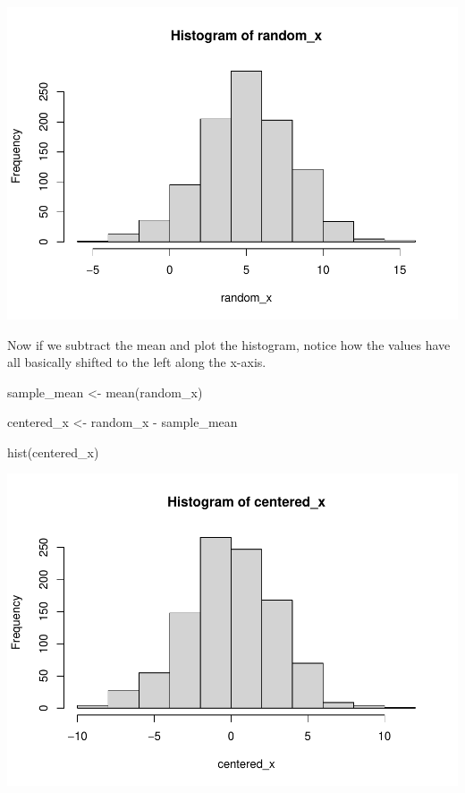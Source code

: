 \documentclass[
]{book}
\newenvironment{Shaded}{\begin{snugshade}}{\end{snugshade}}
\newcommand{\FunctionTok}[1]{\textcolor[rgb]{0.00,0.00,0.00}{#1}}
\newcommand{\NormalTok}[1]{#1}
\newcommand{\OtherTok}[1]{\textcolor[rgb]{0.56,0.35,0.01}{#1}}
\newcommand{\SpecialCharTok}[1]{\textcolor[rgb]{0.00,0.00,0.00}{#1}}
\begin{document}
\includegraphics{test_course_notes_files/figure-latex/unnamed-chunk-74-1.pdf}

Now if we subtract the mean and plot the histogram, notice how the values have all basically shifted to the left along the x-axis.

\begin{Shaded}
\begin{Highlighting}[]
\NormalTok{sample\_mean }\OtherTok{\textless{}{-}} \FunctionTok{mean}\NormalTok{(random\_x)}

\NormalTok{centered\_x }\OtherTok{\textless{}{-}}\NormalTok{ random\_x }\SpecialCharTok{{-}}\NormalTok{ sample\_mean}

\FunctionTok{hist}\NormalTok{(centered\_x)}
\end{Highlighting}
\end{Shaded}

\includegraphics{test_course_notes_files/figure-latex/unnamed-chunk-75-1.pdf}
\end{document}
